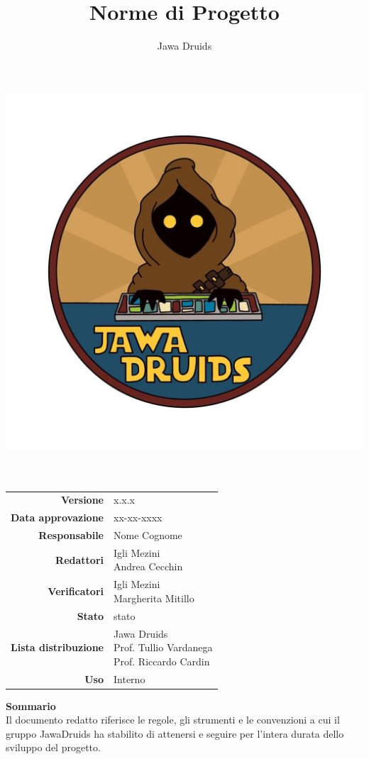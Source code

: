 



	\makeatletter
	\begin{titlepage}
		\begin{center}
			\vspace*{-5cm}
			\author{Jawa Druids}
			\title{Norme di Progetto}
			\date{}
			\includegraphics[width=0.7\linewidth]{../immagini/DRUIDSLOGO.jpg}\\[4ex]
			{\huge \bfseries  \@title }\\[2ex]
			{\LARGE  \@author}\\[50ex]
			\vspace*{-9,0cm}
			\begin{table}[H]
				\renewcommand{\arraystretch}{1.4}
				\centering
				\begin{tabular}{r | l}
					\textbf{Versione} & x.x.x \\
					\textbf{Data approvazione} & xx-xx-xxxx\\
					\textbf{Responsabile} & Nome Cognome\\
					\textbf{Redattori} & \makecell[tl]{Igli Mezini \\ Andrea Cecchin} \\

					\textbf{Verificatori} & \makecell[tl]{Igli Mezini \\ Margherita Mitillo} \\
					\textbf{Stato} & stato\\
					\textbf{Lista distribuzione} & \makecell[tl]{Jawa Druids \\ Prof. Tullio Vardanega \\ Prof. Riccardo Cardin}\\
					\textbf{Uso} & Interno
				\end{tabular}
			\end{table}
			\vspace{0.1cm}
			\hfill \break
			\fontsize{17}{10}\textbf{Sommario} \\
			\vspace{0.1cm}
			Il documento redatto riferisce le regole, gli strumenti e le convenzioni a cui il gruppo JawaDruids ha stabilito di attenersi e seguire per l'intera durata dello sviluppo del progetto.
		\end{center}
	\end{titlepage}
	\makeatother
	

	\tableofcontents{}

	
	
	
	



